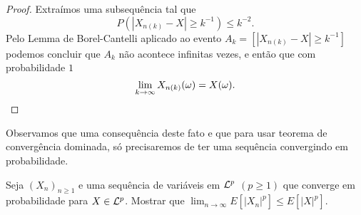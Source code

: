 \begin{proof}
Extraímos uma subsequência tal que
$$P(|X_{n(k)}-X|\ge k^{-1})\le k^{-2}.$$
Pelo Lemma de Borel-Cantelli aplicado ao evento
$A_k= [|X_{n(k)}-X|\ge k^{-1}]$
podemos concluir que $A_k$ não acontece infinitas vezes,
e então que com probabilidade $1$
$$\lim_{k\to \infty} X_{n(k)}(\omega)=X(\omega).$$
\end{proof}

\begin{remark}
  Observamos que uma consequência deste fato e que para usar teorema de convergência dominada, só precisaremos de ter uma sequência convergindo em probabilidade.
\end{remark}



\begin{exercise}
Seja $(X_n)_{n\ge 1}$ e uma sequência de variáveis em ${\mathcal L}^p$ $(p\ge 1)$ que converge em probabilidade para
$X\in {\ensuremath{\mathcal L}}^p$.
Mostrar que $\lim_{n\to \infty} E[|X_n|^p]\le  E[|X|^p]$.
\end{exercise}

